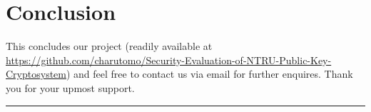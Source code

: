 \chapter{Conclusion}
This concludes our project (readily available at \url{https://github.com/charutomo/Security-Evaluation-of-NTRU-Public-Key-Cryptosystem}) and feel free to contact us via email for further enquires. Thank you for your upmost support.\\
\par\noindent\rule{\textwidth}{0.4pt}
